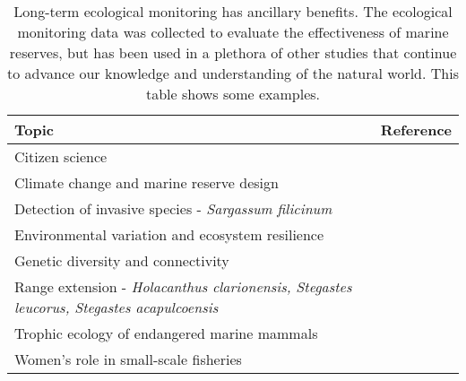 \begin{table}

\caption{\label{tab:lit}Long-term ecological monitoring has ancillary benefits. The ecological monitoring data was collected to evaluate the effectiveness of marine reserves, but has been used in a plethora of other studies that continue to advance our knowledge and understanding of the natural world. This table shows some examples.}
\centering
\begin{tabular}[t]{>{\raggedright\arraybackslash}p{9cm}l}
\toprule
Topic & Reference\\
\midrule
Citizen science & \citet{fulton2019untapped}\\
Climate change and marine reserve design & \citet{alvarez2018designing}\\
Detection of invasive species - \emph{Sargassum filicinum} & \citet{riosmena2012invasive}\\
Environmental variation and ecosystem resilience & \citet{micheli2012evidence}\\
Genetic diversity and connectivity & \citet{munguia2015marine}\\
\addlinespace
Range extension - \emph{Holacanthus clarionensis, Stegastes leucorus, Stegastes acapulcoensis} & \citet{hernandez2016occurrence}\\
Trophic ecology of endangered marine mammals & \citet{arias2019marine}\\
Women's role in small-scale fisheries & \citet{solano2021unveiling}\\
\bottomrule
\end{tabular}
\end{table}